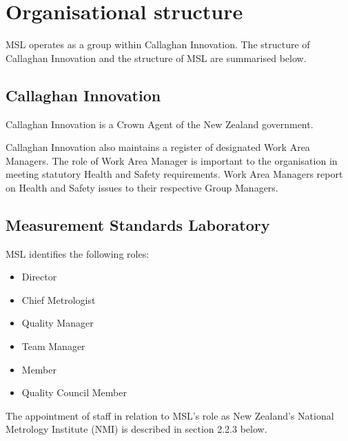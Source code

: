 \section{Organisational structure}
\label{s:organisation}
MSL operates as a group within Callaghan Innovation. The structure of Callaghan Innovation and the structure of MSL are summarised below.

\subsection{Callaghan Innovation}
Callaghan Innovation is a Crown Agent of the New Zealand government. 



Callaghan Innovation also maintains a register of designated Work Area Managers. The role of Work Area Manager is important to the organisation in meeting statutory Health and Safety requirements. 
Work Area Managers report on Health and Safety issues to their respective Group Managers.

\subsection{Measurement Standards Laboratory}
MSL identifies the following roles:
\begin{itemize}
\item	Director
\item	Chief Metrologist
\item	Quality Manager
\item	Team Manager
\item	Member
\item	Quality Council Member
\end{itemize}
The appointment of staff in relation to MSL's role as New Zealand's National Metrology Institute (NMI) is described in section 2.2.3 below.
